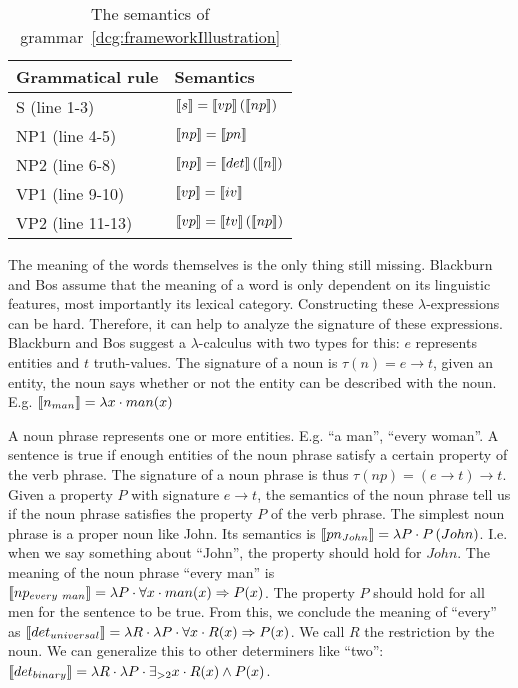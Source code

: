 \begin{table}[h]
  \begin{tabular}{@{}ll}
    \hline
    \textbf{Grammatical rule} & \textbf{Semantics} \\
    \hline
    S (line 1-3) & $\llbracket s \rrbracket = \llbracket vp \rrbracket \left( \llbracket np \rrbracket \right)$ \\
    NP1 (line 4-5) & $\llbracket np \rrbracket = \llbracket pn \rrbracket$ \\
    NP2 (line 6-8) & $\llbracket np \rrbracket = \llbracket det \rrbracket \left( \llbracket n \rrbracket \right)$ \\
    VP1 (line 9-10) & $\llbracket vp \rrbracket = \llbracket iv \rrbracket$ \\
    VP2 (line 11-13) & $\llbracket vp \rrbracket = \llbracket tv \rrbracket \left( \llbracket np \rrbracket \right)$\\
    \hline
  \end{tabular}
  \centering
  \caption{The semantics of grammar~\ref{dcg:frameworkIllustration}}
  \label{tbl:grammar-sem}
\end{table}

The meaning of the words themselves is the only thing still missing. Blackburn and Bos assume that the meaning of a word is only dependent on its linguistic features, most importantly its lexical category. Constructing these $\lambda$-expressions can be hard. Therefore, it can help to analyze the signature of these expressions. Blackburn and Bos suggest a $\lambda$-calculus with two types for this: $e$ represents entities and $t$ truth-values. The signature of a noun is $\tau(n) = e \rightarrow t$, given an entity, the noun says whether or not the entity can be described with the noun. E.g. $\llbracket n_{man} \rrbracket = \lambda x \cdot man(x)$

A noun phrase represents one or more entities. E.g. ``a man'', ``every woman''. A sentence is true if enough entities of the noun phrase satisfy a certain property of the verb phrase. The signature of a noun phrase is thus $\tau(np) = (e \rightarrow t) \rightarrow t$. Given a property $P$ with signature $e \rightarrow t$, the semantics of the noun phrase tell us if the noun phrase satisfies the property $P$ of the verb phrase. The simplest noun phrase is a proper noun like John. Its semantics is $\llbracket pn_{John} \rrbracket = \lambda P \cdot P \left( John \right)$. I.e. when we say something about ``John'', the property should hold for $John$. The meaning of the noun phrase ``every man'' is $\llbracket np_{every\ man} \rrbracket = \lambda P \cdot \forall x \cdot man(x) \Rightarrow P(x)$. The property $P$ should hold for all men for the sentence to be true. From this, we conclude the meaning of ``every'' as $\llbracket det_{universal} \rrbracket = \lambda R \cdot \lambda P \cdot \forall x \cdot R(x) \Rightarrow P(x)$. We call $R$ the restriction by the noun. We can generalize this to other determiners like ``two'': $\llbracket det_{binary} \rrbracket = \lambda R \cdot \lambda P \cdot \exists_{>2} x \cdot R(x) \land P(x)$.


